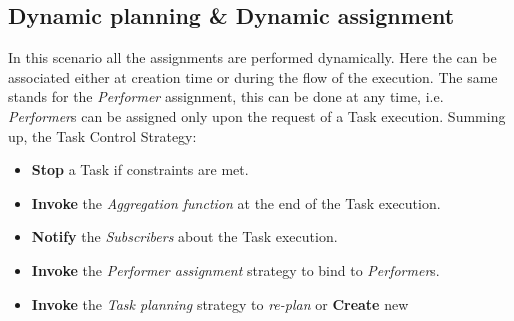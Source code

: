 \subsection{Dynamic \utask{} planning \& Dynamic assignment}
\label{subs:dynamic-dynamic}
In this scenario all the assignments are performed dynamically. Here the \utask{}
can be associated either at creation time or during the flow of the execution.
The same stands for the \emph{Performer} assignment, this can be done at any time,
i.e. \emph{Performer}s can be assigned only upon the request of a Task execution. 
Summing up, the Task Control Strategy:
\begin{itemize}
	\item \textbf{Stop} a Task if constraints are met.
	\item \textbf{Invoke} the \emph{Aggregation function} at the end of the Task
	execution.
	\item \textbf{Notify} the \emph{Subscribers} about the Task execution.
	\item \textbf{Invoke} the \emph{Performer assignment} strategy to bind \utask{}
	to \emph{Performer}s.
	\item \textbf{Invoke} the \emph{Task planning} strategy to \emph{re-plan}
	\utask{} or \textbf{Create} new \utask{}
\end{itemize}